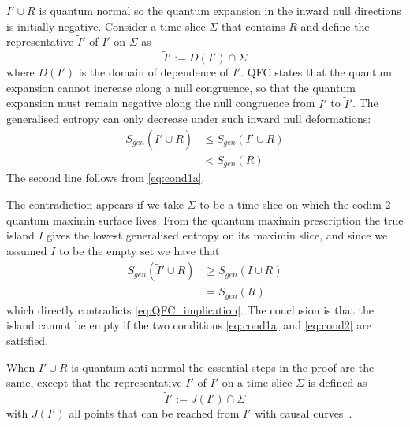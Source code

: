 \documentclass[a4paper,11pt]{article}
\newcommand{\cts}[1]{\ignorespaces}
\def\bne{\begin{equation}}
\def\ene{\end{equation}}
\begin{document}
$I' \cup R$ is quantum normal so the quantum expansion in the inward null directions is initially negative. Consider a time slice $\Sigma$ that contains $R$ and define the representative $\tilde{I}'$ of $I'$ on $\Sigma$ as
\bne \label{eq:tildeI'def} \tilde{I}' := D(I') \cap \Sigma \ene
where $D(I')$ is the domain of dependence of $I'$.  QFC states that the quantum expansion cannot increase along a null congruence, so that the quantum expansion must remain negative along the null congruence from $I'$ to $\tilde{I}'$. The generalised entropy can only decrease under such inward null deformations:
\bne \label{eq:QFC_implication} \begin{split} S_{gen} (\tilde I ' \cup R) &\leq S_{gen} (I' \cup R)\\
& < S_{gen} (R)
\end{split} \ene
The second line follows from \eqref{eq:cond1a}. 

The contradiction appears if we take $\Sigma$ to be a time slice on which the codim-2 quantum maximin surface lives. 
From the quantum maximin prescription the true island $I$ gives the lowest generalised entropy on its maximin slice, and since we assumed $I$ to be the empty set we have that
\bne \begin{split} S_{gen}(\tilde I' \cup R) &\geq S_{gen} (I \cup R) \\ &= S_{gen} (R) \end{split} \ene
which directly contradicts \eqref{eq:QFC_implication}. The conclusion is that the island cannot be empty if the two conditions \eqref{eq:cond1a} and \eqref{eq:cond2} are satisfied.


When $I' \cup R$ is quantum anti-normal the essential steps in the proof are the same, except that the representative $\tilde{I}'$ of $I'$ on a time slice $\Sigma$ is defined as
\bne \tilde{I}' := J(I') \cap \Sigma \ene 
with $J(I')$ all points that can be reached from $I'$ with causal curves~\cite{Bousso2021}. 
\end{document}
